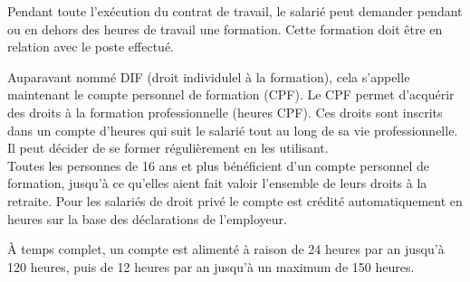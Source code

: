 Pendant toute l’exécution du contrat de travail, le salarié peut demander pendant ou en dehors des heures de travail une formation.
Cette formation doit être en relation avec le poste effectué.

Auparavant nommé DIF (droit individulel à la formation), cela s’appelle maintenant le compte personnel de formation (CPF).
Le CPF permet d’acquérir des  droits à la formation professionnelle (heures CPF).
Ces droits sont inscrits dans un compte d’heures qui suit le salarié tout au long de sa vie professionnelle.
Il peut décider de se former régulièrement en les utilisant.\\

Toutes les personnes de 16 ans et plus bénéficient d’un compte personnel de formation, jusqu’à ce qu’elles aient fait valoir l’ensemble de leurs droits à la retraite.
Pour les salariés de droit privé le compte est crédité automatiquement en heures sur la base des déclarations de l'employeur.

À temps complet, un compte est alimenté à raison de 24 heures par an jusqu’à 120 heures, puis de 12 heures par an jusqu’à un maximum de 150 heures.